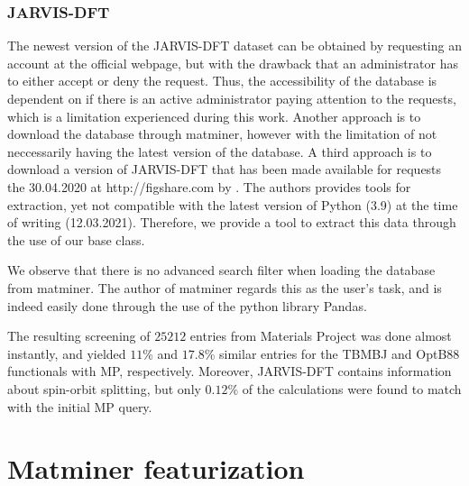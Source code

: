 \subsubsection{JARVIS-DFT}

The newest version of the JARVIS-DFT dataset can be obtained by requesting an account at the official webpage, but with the drawback that an administrator has to either accept or deny the request. Thus, the accessibility of the database is dependent on if there is an active administrator paying attention to the requests, which is a limitation experienced during this work. Another approach is to download the database through matminer, however with the limitation of not neccessarily having the latest version of the database. A third approach is to download a version of JARVIS-DFT that has been made available for requests the 30.04.2020 at http://figshare.com by \citeauthor{Choudhary2020} \cite{Choudhary2020}. The authors provides tools for extraction, yet not compatible with the latest version of Python (3.9) at the time of writing (12.03.2021). Therefore, we provide a tool to extract this data through the use of our base class.



We observe that there is no advanced search filter when loading the database from matminer. The author of matminer regards this as the user's task, and is indeed easily done through the use of the python library Pandas.

The resulting screening of $25212$ entries from Materials Project was done almost instantly, and yielded $11$\% and $17.8$\% similar entries for the TBMBJ and OptB88 functionals with MP, respectively. Moreover, JARVIS-DFT contains information about spin-orbit splitting, but only $0.12\%$ of the calculations were found to match with the initial MP query.

\section{Matminer featurization}

